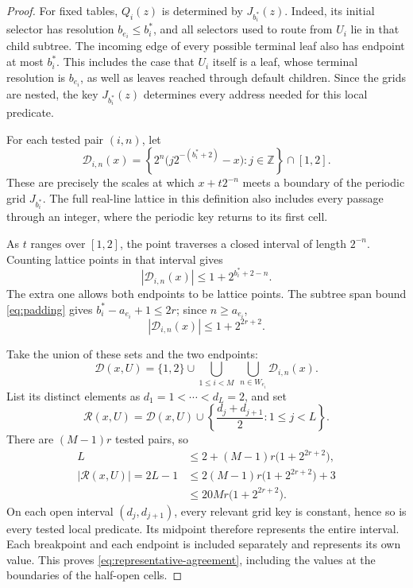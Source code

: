 \begin{proof}
For fixed tables, $Q_i(z)$ is determined by $J_{b_i^*}(z)$.
Indeed, its initial selector has resolution $b_{e_i}\le b_i^*$,
and all selectors used to route from $U_i$ lie in that child subtree.
The incoming edge of every possible terminal leaf also has endpoint
at most $b_i^*$.  This includes the case that $U_i$ itself is a leaf,
whose terminal resolution is $b_{e_i}$, as well as leaves reached
through default children.  Since the grids are nested, the key
$J_{b_i^*}(z)$ determines every address needed for this local predicate.

For each tested pair $(i,n)$, let
\[
 \mathcal D_{i,n}(x)=
 \left\{2^n\bigl(j2^{-(b_i^*+2)}-x\bigr):j\in\mathbb Z\right\}
 \cap[1,2].
\]
These are precisely the scales at which $x+t2^{-n}$ meets a boundary
of the periodic grid $J_{b_i^*}$.  The full real-line lattice in this
definition also includes every passage through an integer, where the
periodic key returns to its first cell.

As $t$ ranges over $[1,2]$, the point traverses a closed interval of
length $2^{-n}$.  Counting lattice points in that interval gives
\[
 |\mathcal D_{i,n}(x)|\le1+2^{b_i^*+2-n}.
\]
The extra one allows both endpoints to be lattice points.  The subtree
span bound \eqref{eq:padding} gives $b_i^*-a_{e_i}+1\le2r$; since
$n\ge a_{e_i}$,
\[
 |\mathcal D_{i,n}(x)|\le1+2^{2r+2}.
\]

Take the union of these sets and the two endpoints:
\[
 \mathcal D(x,U)=\{1,2\}\cup
 \bigcup_{1\le i<M}\ \bigcup_{n\in W_{e_i}}\mathcal D_{i,n}(x).
\]
List its distinct elements as $d_1=1<\cdots<d_L=2$, and set
\[
 \mathcal R(x,U)=\mathcal D(x,U)
 \cup\left\{\frac{d_j+d_{j+1}}2:1\le j<L\right\}.
\]
There are $(M-1)r$ tested pairs, so
\begin{align*}
 L&\le2+(M-1)r\bigl(1+2^{2r+2}\bigr),\\
 |\mathcal R(x,U)|=2L-1
 &\le2(M-1)r\bigl(1+2^{2r+2}\bigr)+3\\
 &\le20Mr\bigl(1+2^{2r+2}\bigr).
\end{align*}
On each open interval $(d_j,d_{j+1})$, every relevant grid key is
constant, hence so is every tested local predicate.  Its midpoint
therefore represents the entire interval.  Each breakpoint and each
endpoint is included separately and represents its own value.  This
proves \eqref{eq:representative-agreement}, including the values at
the boundaries of the half-open cells.
\end{proof}

